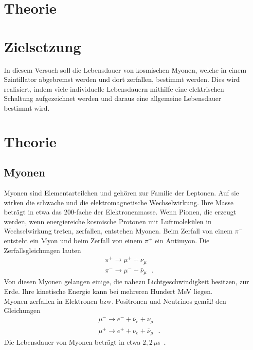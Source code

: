 \section{Theorie}
\label{sec:Theorie}


  \section{Zielsetzung}

    In diesem Versuch soll die Lebensdauer von kosmischen Myonen,
    welche in einem Szintillator abgebremst werden und dort zerfallen,
    bestimmt werden. Dies wird realisiert, indem viele individuelle Lebensdauern
    mithilfe eine elektrischen Schaltung
    aufgezeichnet werden und daraus eine allgemeine Lebensdauer bestimmt wird.


  \section{Theorie}

    \subsection{Myonen}

    Myonen sind Elementarteilchen und gehören zur Familie der Leptonen.
    Auf sie wirken die schwache und die elektromagnetische Wechselwirkung.
    Ihre Masse beträgt in etwa das 200-fache der Elektronenmasse.
    Wenn Pionen, die erzeugt werden, wenn energiereiche kosmische Protonen
    mit Luftmolekülen in Wechselwirkung treten, zerfallen, entstehen Myonen.
    Beim Zerfall von einem $\pi^-$ entsteht ein Myon und beim Zerfall von
    einem $\pi^+$ ein Antimyon. Die Zerfallsgleichungen lauten
    \begin{align*}
      &\pi^+ \to \mu^+ +\nu_{\mu}\\
      &\pi^- \to \mu^- +\bar{\nu}_{\mu}\,\,\,\,.
    \end{align*}
    Von diesen Myonen gelangen einige, die nahezu Lichtgeschwindigkeit
    besitzen, zur Erde. Ihre kinetische Energie kann bei mehreren Hundert MeV
    liegen. \\
    Myonen zerfallen in Elektronen bzw. Positronen und Neutrinos gemäß den Gleichungen
    \begin{align*}
      &\mu^- \to e^- +\bar{\nu}_e+\nu_{\mu}\\
      &\mu^+ \to e^+ +\nu_e +\bar{\nu}_{\mu}\,\,\,\,.
    \end{align*}
    Die Lebensdauer von Myonen beträgt in etwa $2,2\,\mu$s~\cite{pdg}.

